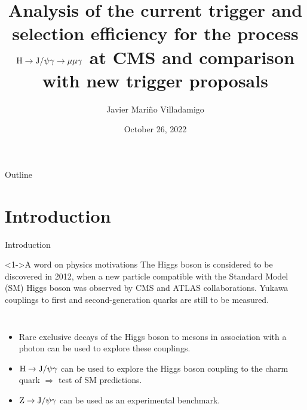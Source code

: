 \documentclass[aspectratio = 1610, xcolor = dvipsnames]{beamer}
\title[]{{\large  Analysis of the current trigger and selection efficiency for the process $\H \rightarrow \JPsi\gamma \rightarrow \mu\mu\gamma$ at CMS and comparison with new trigger proposals}} %
\author{Javier Mariño Villadamigo} %
\institute[unipd] %
{
	\scriptsize{Research Activities} \\ 
	\scriptsize{Academic year: 2021/2022} \\
	\smallskip
	\scriptsize{Università degli studi di Padova} %
}
\date{October 26, 2022} %
\newcommand{\JPsi}{{\rm J}/\psi}
\begin{document}
	
	\begin{frame}
		\titlepage %
	\end{frame}

	
	
	
	
	\begin{frame}[t]{Outline}
        \tableofcontents
	\end{frame}
	
	
    \section{Introduction}
    
    \begin{frame}[t]{Introduction}

        \begin{block}<1->{A word on physics motivations}
            The Higgs boson is considered to be discovered in 2012, when a new particle compatible with the Standard Model (SM) Higgs boson was observed by CMS and ATLAS collaborations. Yukawa couplings to first and second-generation quarks are still to be measured.
        \end{block}

        \begin{columns}[c]

            
            \begin{itemize}
                \item \textcolor{unipd}{Rare exclusive decays} of the Higgs boson to mesons in association with a photon can be used to explore these couplings.
                \item ${\rm H}\rightarrow \JPsi \gamma$ can be used to explore the Higgs boson \textcolor{unipd}{coupling to the charm quark} $\Rightarrow$ \textcolor{unipd}{test of SM predictions}.
                \item ${\rm Z}\rightarrow \JPsi \gamma$ can be used as an \textcolor{unipd}{experimental benchmark}.
            \end{itemize}

        \end{columns}
    \end{frame}
	
\end{document}
